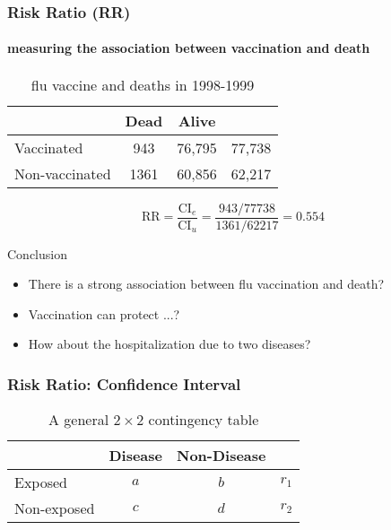 \documentclass[table,10pt]{beamer}
\begin{document}
\begin{CJK*}{UTF8}{gbsn}
\begin{frame}[t]
\frametitle{Risk Ratio (RR)}
\framesubtitle{measuring the association between vaccination and death}
\begin{table}
\renewcommand\arraystretch{1.2}
\small
\caption{flu vaccine and deaths in 1998-1999}
\begin{tabular}{lccc}
\hline
 & Dead & Alive & \\
\hline
Vaccinated & 943 & 76,795 & 77,738\\
Non-vaccinated & 1361 & 60,856 & 62,217\\
\hline
\end{tabular}
\end{table}
$$\textrm{RR} = \frac{\textrm{CI}_e}{\textrm{CI}_u} = \frac{943/77738}{1361/62217} = 0.554$$
\begin{alertblock}{\center Conclusion}
\begin{itemize}
	\item There is a strong association between flu vaccination and death?
	\item Vaccination can protect ...?
	\item How about the hospitalization due to two diseases?
\end{itemize}
\end{alertblock}
\end{frame}


\begin{frame}[t]
\frametitle{Risk Ratio: Confidence Interval}
\begin{table}
\renewcommand\arraystretch{1.2}
\scriptsize
\caption{A general $2 \times 2$ contingency table}
\begin{tabular}{lccc}
\hline
 & Disease & Non-Disease & \\
\hline
Exposed & $a$ & $b$ & $r_1$\\
Non-exposed & $c$ & $d$ & $r_2$\\
\hline
\end{tabular}
\end{table}
\end{frame}



\end{CJK*}
\end{document}
